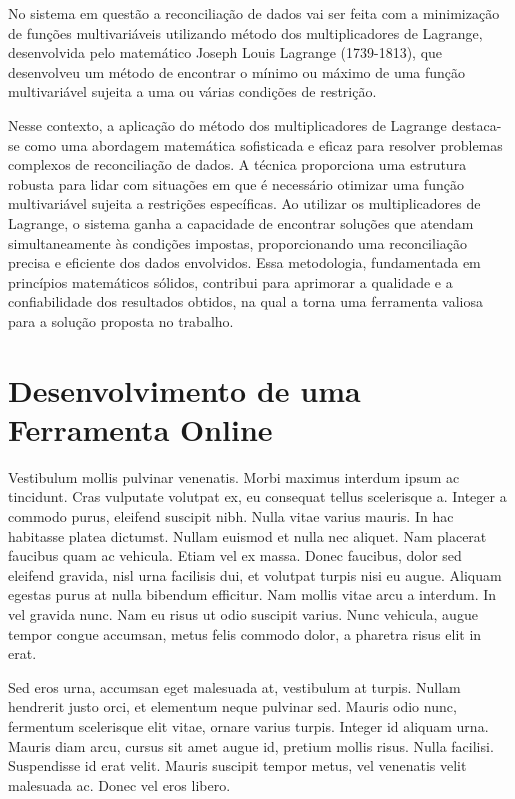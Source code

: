 No sistema em questão a reconciliação de dados vai ser feita com a minimização de funções multivariáveis utilizando método dos multiplicadores de Lagrange, desenvolvida pelo matemático Joseph Louis Lagrange (1739-1813), que desenvolveu um método de encontrar o mínimo ou máximo de uma função multivariável sujeita a uma ou várias condições de restrição.

Nesse contexto, a aplicação do método dos multiplicadores de Lagrange destaca-se como uma abordagem matemática sofisticada e eficaz para resolver problemas complexos de reconciliação de dados. A técnica proporciona uma estrutura robusta para lidar com situações em que é necessário otimizar uma função multivariável sujeita a restrições específicas. Ao utilizar os multiplicadores de Lagrange, o sistema ganha a capacidade de encontrar soluções que atendam simultaneamente às condições impostas, proporcionando uma reconciliação precisa e eficiente dos dados envolvidos. Essa metodologia, fundamentada em princípios matemáticos sólidos, contribui para aprimorar a qualidade e a confiabilidade dos resultados obtidos, na qual a torna uma ferramenta valiosa para a solução proposta no trabalho.

\section{Desenvolvimento de uma Ferramenta Online}

Vestibulum mollis pulvinar venenatis. Morbi maximus interdum ipsum ac tincidunt. Cras vulputate volutpat ex, eu consequat tellus scelerisque a. Integer a commodo purus, eleifend suscipit nibh. Nulla vitae varius mauris. In hac habitasse platea dictumst. Nullam euismod et nulla nec aliquet. Nam placerat faucibus quam ac vehicula. Etiam vel ex massa. Donec faucibus, dolor sed eleifend gravida, nisl urna facilisis dui, et volutpat turpis nisi eu augue. Aliquam egestas purus at nulla bibendum efficitur. Nam mollis vitae arcu a interdum. In vel gravida nunc. Nam eu risus ut odio suscipit varius. Nunc vehicula, augue tempor congue accumsan, metus felis commodo dolor, a pharetra risus elit in erat.

Sed eros urna, accumsan eget malesuada at, vestibulum at turpis. Nullam hendrerit justo orci, et elementum neque pulvinar sed. Mauris odio nunc, fermentum scelerisque elit vitae, ornare varius turpis. Integer id aliquam urna. Mauris diam arcu, cursus sit amet augue id, pretium mollis risus. Nulla facilisi. Suspendisse id erat velit. Mauris suscipit tempor metus, vel venenatis velit malesuada ac. Donec vel eros libero.


